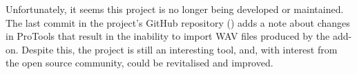 Unfortunately, it seems this project is no longer being developed or maintained. 
The last commit in the project's GitHub repository (\cite{soundobjects_addon_repo}) adds a note 
about changes in ProTools that result in the inability to import WAV files produced by the add-on.
Despite this, the project is still an interesting tool, and, with interest from the open source community, 
could be revitalised and improved.



